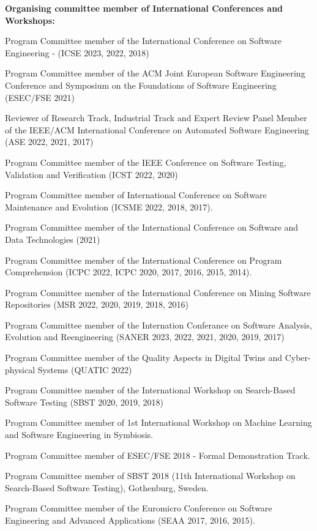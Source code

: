 \documentclass[10pt]{article}
\newcommand\on[1]{\nbc{ON}{#1}{red}} %
\begin{document}
\textbf{Organising committee member of International Conferences and Workshops:}
\begin{innerlist}
\item Program Committee member of the International Conference on Software Engineering - (ICSE 2023, 2022, 2018)
\item Program Committee member of the  ACM Joint European Software Engineering Conference and Symposium on the Foundations of Software Engineering (ESEC/FSE 2021)
\item Reviewer of Research Track, Industrial Track and Expert Review Panel Member of the IEEE/ACM International Conference on Automated Software Engineering (ASE 2022, 2021, 2017)
\item Program Committee member of  the IEEE Conference on Software Testing, Validation and Verification (ICST 2022, 2020) 
\item Program Committee member of  International Conference on Software Maintenance and Evolution (ICSME 2022, 2018, 2017). 
\item Program Committee member of the  International Conference on Software and Data Technologies (2021)
\item Program Committee member of the International Conference on Program Comprehension (ICPC 2022, ICPC 2020, 2017, 2016, 2015, 2014).
\item Program Committee member of  the International Conference on Mining Software Repositories (MSR 2022, 2020, 2019, 2018, 2016)  
\item Program Committee member of  the Internation Conferance on Software Analysis, Evolution and Reengineering (SANER 2023, 2022, 2021, 2020, 2019, 2017)
\item Program Committee member of  the  Quality Aspects in Digital Twins and Cyber-physical Systems (QUATIC 2022)   
\item Program Committee member of  the  International Workshop on Search-Based Software Testing (SBST 2020, 2019, 2018)   
\item Program Committee member of 1st International Workshop on Machine Learning and Software Engineering in Symbiosis.
\item Program Committee member of  ESEC/FSE 2018 - Formal Demonstration Track.
\item Program Committee member of SBST 2018 (11th International Workshop on Search-Based Software Testing), Gothenburg, Sweden.
\item Program Committee member of the Euromicro Conference on Software Engineering and Advanced Applications (SEAA 2017, 2016, 2015).

\end{innerlist}
\end{document}

